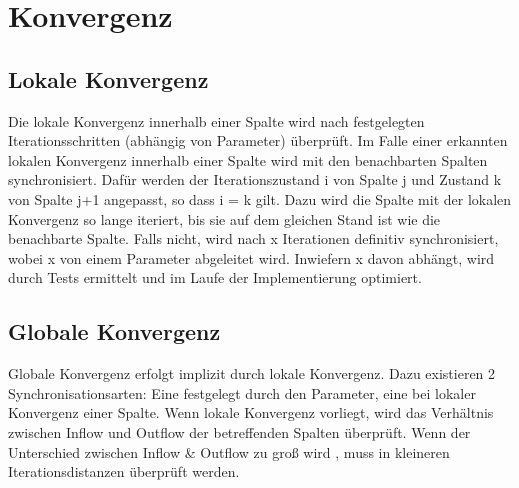 \section{Konvergenz}
\subsection{Lokale Konvergenz}
Die lokale Konvergenz innerhalb einer Spalte wird nach festgelegten Iterationsschritten (abhängig von Parameter) überprüft. Im Falle einer erkannten lokalen Konvergenz innerhalb einer Spalte wird mit den benachbarten Spalten synchronisiert. Dafür werden der Iterationszustand i von Spalte j und  Zustand k von Spalte j+1 angepasst, so dass i = k gilt. Dazu wird die Spalte mit der lokalen Konvergenz so lange iteriert, bis sie auf dem gleichen Stand ist wie die benachbarte Spalte. Falls nicht, wird nach x Iterationen definitiv synchronisiert, wobei x von einem Parameter abgeleitet wird. Inwiefern x davon abhängt, wird durch Tests ermittelt und im Laufe der Implementierung optimiert. 

\subsection{Globale Konvergenz}
Globale Konvergenz erfolgt implizit durch lokale Konvergenz. Dazu existieren 2 Synchronisationsarten: Eine festgelegt durch den Parameter, eine bei lokaler Konvergenz einer Spalte.
Wenn lokale Konvergenz vorliegt, wird das Verhältnis zwischen Inflow und Outflow der betreffenden Spalten überprüft. Wenn der  Unterschied zwischen Inflow \& Outflow zu groß wird , muss in kleineren Iterationsdistanzen überprüft werden. 


